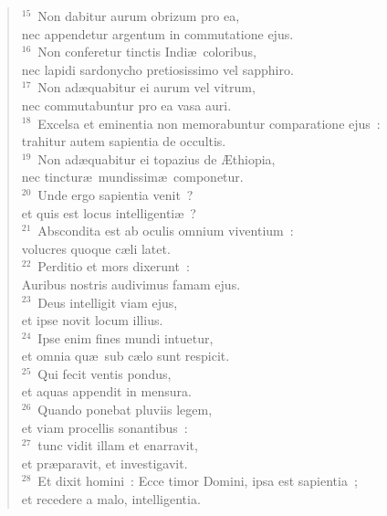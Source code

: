 \begin{flushleft}
\begin{verse}
${}^{15}$~Non dabitur aurum obrizum pro ea,\\ nec appendetur argentum in commutatione ejus.\\
${}^{16}$~Non conferetur tinctis Indi\ae\ coloribus,\\ nec lapidi sardonycho pretiosissimo vel sapphiro.\\
${}^{17}$~Non ad\ae quabitur ei aurum vel vitrum,\\ nec commutabuntur pro ea vasa auri.\\
${}^{18}$~Excelsa et eminentia non memorabuntur comparatione ejus~:\\ trahitur autem sapientia de occultis.\\
${}^{19}$~Non ad\ae quabitur ei topazius de \AE thiopia,\\ nec tinctur\ae\ mundissim\ae\ componetur.\\
${}^{20}$~Unde ergo sapientia venit~?\\ et quis est locus intelligenti\ae~?\\
${}^{21}$~Abscondita est ab oculis omnium viventium~:\\ volucres quoque c\ae li latet.\\
${}^{22}$~Perditio et mors dixerunt~:\\ Auribus nostris audivimus famam ejus.\\
${}^{23}$~Deus intelligit viam ejus,\\ et ipse novit locum illius.\\
${}^{24}$~Ipse enim fines mundi intuetur,\\ et omnia qu\ae\ sub c\ae lo sunt respicit.\\
${}^{25}$~Qui fecit ventis pondus,\\ et aquas appendit in mensura.\\
${}^{26}$~Quando ponebat pluviis legem,\\ et viam procellis sonantibus~:\\
${}^{27}$~tunc vidit illam et enarravit,\\ et pr\ae paravit, et investigavit.\\
${}^{28}$~Et dixit homini~: Ecce timor Domini, ipsa est sapientia~;\\ et recedere a malo, intelligentia.\end{verse}\end{flushleft}



